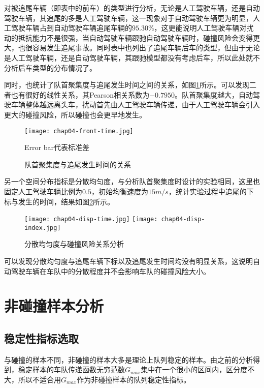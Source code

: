 对被追尾车辆（即表中的前车）的类型进行分析，无论是人工驾驶车辆，还是自动驾驶车辆，其追尾的多是人工驾驶车辆，这一现象对于自动驾驶车辆更为明显，人工驾驶车辆占到自动驾驶车辆追尾车辆的$95.30\%$，这更能说明人工驾驶车辆对扰动的抵抗能力不是很强，当自动驾驶车辆跟驰自动驾驶车辆时，碰撞风险会变得更大，也很容易发生追尾事故。同时表中也列出了追尾车辆后车的类型，但由于无论是人工驾驶车辆，还是自动驾驶车辆，其跟驰模型都没有考虑后车，所以此处就不分析后车类型的分布情况了。

同时，也统计了队首聚集度与追尾发生时间之间的关系，如图\ref{fig:chap04-6}所示。可以发现二者也有很好的线性关系，其Pearson相关系数为$-0.7950$。队首聚集度越大，自动驾驶车辆整体越远离头车，扰动首先由人工驾驶车辆传递，由于人工驾驶车辆会引入更大的碰撞风险，所以碰撞也会更早地发生。

\begin{figure}
    \centering
    \texttt{[image: chap04-front-time.jpg]}
    \caption*{Error bar代表标准差}
    \caption{队首聚集度与追尾发生时间的关系}
    \label{fig:chap04-6}
\end{figure} 

另一个空间分布指标是分散均匀度，与分析队首聚集度时设计的实验相同，这里也固定人工驾驶车辆比例为$0.5$，初始均衡速度为$15m/s$，统计实验过程中追尾的下标与发生的时间，结果如图\ref{fig:chap04-7}所示。

\begin{figure}
    \centering
      {\texttt{[image: chap04-disp-time.jpg]}}
      {\texttt{[image: chap04-disp-index.jpg]}}
      \caption{分散均匀度与碰撞风险关系分析}
    \label{fig:chap04-7}
  \end{figure}

可以发现分散均匀度与追尾车辆下标以及追尾发生时间均没有明显关系，这说明自动驾驶车辆在车队中的分散程度并不会影响车队的碰撞风险大小。

\section{非碰撞样本分析}
\label{sec:4.3}

\subsection{稳定性指标选取}

 与碰撞的样本不同，非碰撞的样本大多是理论上队列稳定的样本。由之前的分析得到，稳定样本的车队传递函数无穷范数$G_{max}$集中在一个很小的区间内，区分度不大，所以不适合用$G_{max}$作为非碰撞样本的队列稳定性指标。

